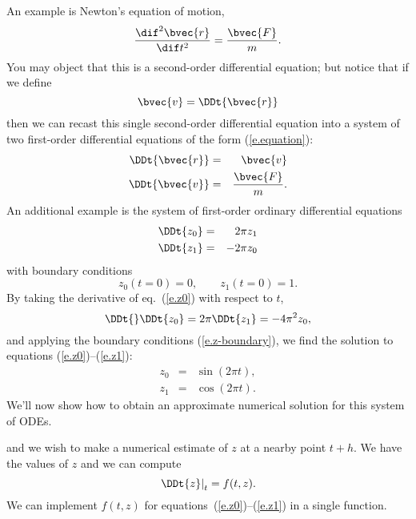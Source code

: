 An example is Newton's equation of motion,
\begin{equation}\label{e.Newton-2nd}
\frac{\dif^{2}\bvec{r}}{\dif t^{2}} = \frac{\bvec{F}}{m}.
\end{equation}
You may object that this is a second-order differential equation; but notice that if we define
\[
	\bvec{v} = \DDt{\bvec{r}}
\]
then we can recast this single second-order differential equation into a system of two first-order differential equations of the form (\ref{e.equation}):
\begin{eqnarray}
	\DDt{\bvec{r}} &=& \bvec{v}\\
	\DDt{\bvec{v}} &=& \frac{\bvec{F}}{m}.
\end{eqnarray}
An additional example is the system of first-order ordinary differential equations
\begin{eqnarray}
\DDt{z_{0}} &=&  2\pi z_{1}\label{e.z0}\\
\DDt{z_{1}} &=& -2\pi z_{0}\label{e.z1}
\end{eqnarray}
with boundary conditions
\begin{equation}\label{e.z-boundary}
	z_{0}(t=0) = 0,\qquad z_{1}(t=0) = 1.
\end{equation}
By taking the derivative of eq.~(\ref{e.z0}) with respect to $t$,
\[
	\DDt{}\DDt{z_{0}} = 2\pi\DDt{z_{1}} = -4\pi^{2} z_{0},
\]
and applying the boundary conditions (\ref{e.z-boundary}),
we find the solution to equations (\ref{e.z0})--(\ref{e.z1}):
\begin{eqnarray}
z_{0} &=& \sin(2\pi t),\label{e.z0-sol}\\
z_{1} &=& \cos(2\pi t).\label{e.z1-sol}
\end{eqnarray}
We'll now show how to obtain an approximate numerical solution for this system of ODEs.

 and we wish to make a numerical estimate of $z$ at a nearby point $t+h$. We have the values of $z$ and we can compute
\[
	\left.\DDt{z}\right|_{t} = f(t,z).
\]
We can implement $f(t,z)$ for equations~(\ref{e.z0})--(\ref{e.z1}) in a single function.

